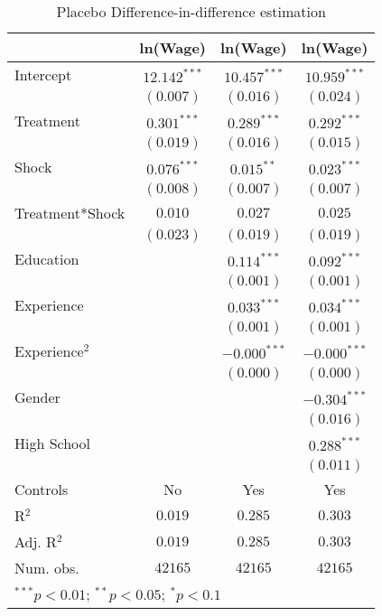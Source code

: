 
\begin{table}[H]
\caption{Placebo Difference-in-difference estimation}
\begin{center}
\begin{tabular}{l c c c}
\hline
 & ln(Wage) & ln(Wage) & ln(Wage) \\
\hline
Intercept       & $12.142^{***}$ & $10.457^{***}$ & $10.959^{***}$ \\
                & $(0.007)$      & $(0.016)$      & $(0.024)$      \\
Treatment       & $0.301^{***}$  & $0.289^{***}$  & $0.292^{***}$  \\
                & $(0.019)$      & $(0.016)$      & $(0.015)$      \\
Shock           & $0.076^{***}$  & $0.015^{**}$   & $0.023^{***}$  \\
                & $(0.008)$      & $(0.007)$      & $(0.007)$      \\
Treatment*Shock & $0.010$        & $0.027$        & $0.025$        \\
                & $(0.023)$      & $(0.019)$      & $(0.019)$      \\
Education       &                & $0.114^{***}$  & $0.092^{***}$  \\
                &                & $(0.001)$      & $(0.001)$      \\
Experience      &                & $0.033^{***}$  & $0.034^{***}$  \\
                &                & $(0.001)$      & $(0.001)$      \\
Experience$^2$  &                & $-0.000^{***}$ & $-0.000^{***}$ \\
                &                & $(0.000)$      & $(0.000)$      \\
Gender          &                &                & $-0.304^{***}$ \\
                &                &                & $(0.016)$      \\
High School     &                &                & $0.288^{***}$  \\
                &                &                & $(0.011)$      \\
\hline
Controls        & No             & Yes            & Yes            \\
R$^2$           & $0.019$        & $0.285$        & $0.303$        \\
Adj. R$^2$      & $0.019$        & $0.285$        & $0.303$        \\
Num. obs.       & $42165$        & $42165$        & $42165$        \\
\hline
\multicolumn{4}{l}{\scriptsize{$^{***}p<0.01$; $^{**}p<0.05$; $^{*}p<0.1$}}
\end{tabular}
\label{table:coefficients}
\end{center}
\end{table}
